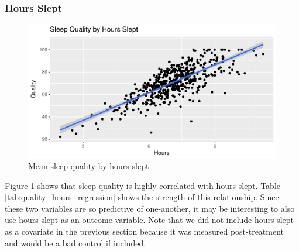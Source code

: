 \documentclass[12pt,]{article}
\begin{document}
\hypertarget{hours-slept}{%
\subsubsection{Hours Slept}\label{hours-slept}}

\begin{figure}
\centering
\includegraphics{report_files/figure-latex/quality_by_hours_fig-1.pdf}
\caption{\label{fig:quality_by_hours_fig} Mean sleep quality by hours
slept}
\end{figure}

Figure \ref{fig:quality_by_hours_fig} shows that sleep quality is highly
correlated with hours slept. Table \ref{tab:quality_hours_regression}
shows the strength of this relationship. Since these two variables are
so predictive of one-another, it may be interesting to also use hours
slept as an outcome variable. Note that we did not include hours slept
as a covariate in the previous section because it was measured
post-treatment and would be a bad control if included.
\end{document}
